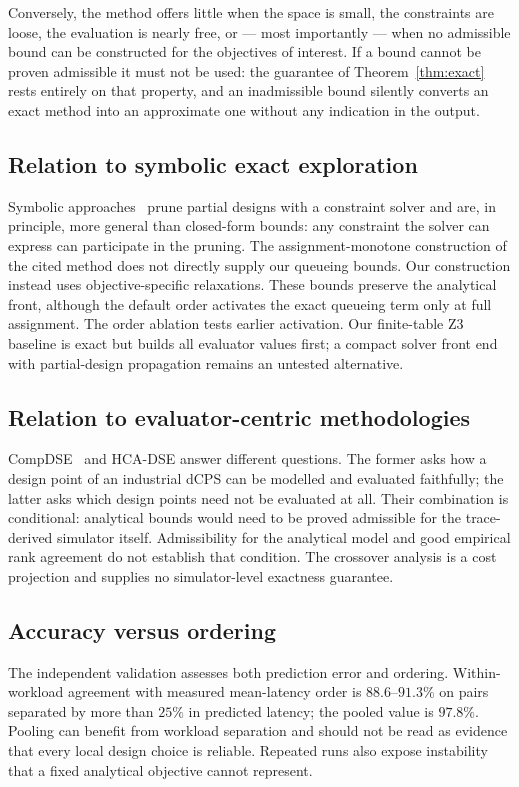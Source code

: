 \documentclass[preprint,11pt,3p]{elsarticle}
\theoremstyle{plain}
\theoremstyle{definition}
\newcommand{\WithinAgreementRange}{88.6\text{--}91.3}
\newcommand{\PooledAgreement}{97.8}
\begin{document}
Conversely, the method offers little when the space is small, the constraints are loose,
the evaluation is nearly free, or --- most importantly --- when no admissible bound can be
constructed for the objectives of interest. If a bound cannot be proven admissible it must
not be used: the guarantee of Theorem~\ref{thm:exact} rests entirely on that property, and
an inadmissible bound silently converts an exact method into an approximate one without
any indication in the output.

\subsection{Relation to symbolic exact exploration}
Symbolic approaches~\cite{neubauer2018exact} prune partial designs with a constraint
solver and are, in principle, more general than closed-form bounds: any constraint the
solver can express can participate in the pruning. The assignment-monotone construction of the cited method does not directly
supply our queueing bounds. Our construction instead uses objective-specific
relaxations. These bounds preserve the analytical front, although the default order activates the exact queueing term only at full assignment. The order ablation tests earlier activation. Our finite-table Z3 baseline is exact but builds all evaluator values first; a compact solver front end with partial-design propagation remains an untested alternative.

\subsection{Relation to evaluator-centric methodologies}
CompDSE~\cite{saadatmand2025compdse} and HCA-DSE answer different questions. The former
asks how a design point of an industrial dCPS can be modelled and evaluated faithfully;
the latter asks which design points need not be evaluated at all. Their combination is
conditional: analytical bounds would need to be proved admissible for the
trace-derived simulator itself. Admissibility for the analytical model and good
empirical rank agreement do not establish that condition. The crossover analysis
is a cost projection and supplies no simulator-level exactness guarantee.

\subsection{Accuracy versus ordering}
The independent validation assesses both prediction error and ordering. Within-workload
agreement with measured mean-latency order is $\WithinAgreementRange\%$ on pairs
separated by more than $25\%$ in predicted latency; the pooled value is
$\PooledAgreement\%$. Pooling can benefit from workload separation and should not be
read as evidence that every local design choice is reliable. Repeated runs also expose
instability that a fixed analytical objective cannot represent.
\end{document}
